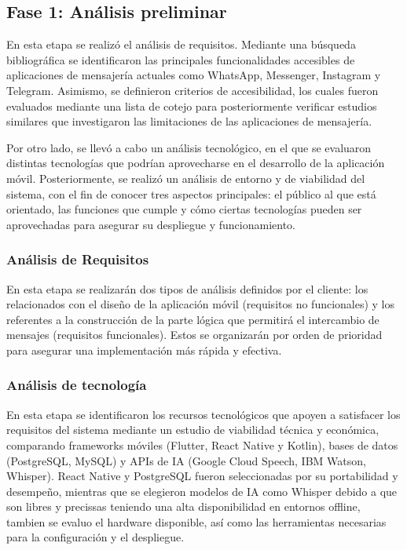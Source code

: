 \documentclass[lettersize,journal]{IEEEtran}
\begin{document}
        
        \subsection{Fase 1: Análisis preliminar}
        	
        En esta etapa se realizó el análisis de requisitos. Mediante una búsqueda bibliográfica se identificaron las principales funcionalidades accesibles de aplicaciones de mensajería actuales como WhatsApp, Messenger, Instagram y Telegram. Asimismo, se definieron criterios de accesibilidad, los cuales fueron evaluados mediante una lista de cotejo para 
        posteriormente verificar estudios similares que investigaron las limitaciones de las aplicaciones de mensajería.	    	
       
        Por otro lado, se llevó a cabo un análisis tecnológico, en el que se evaluaron distintas tecnologías que podrían aprovecharse en el desarrollo de la aplicación móvil. Posteriormente, se realizó un análisis de entorno y de viabilidad del sistema, con el fin de conocer tres aspectos principales: el público al que está orientado, las funciones que cumple y cómo ciertas tecnologías pueden ser aprovechadas para asegurar su despliegue y funcionamiento.  
        
       \subsubsection{Análisis de Requisitos}
        
        En esta etapa se realizarán dos tipos de análisis definidos por el cliente: los relacionados con el diseño de la aplicación móvil (requisitos no funcionales) y los referentes a la construcción de la parte lógica que permitirá el intercambio de mensajes (requisitos funcionales). Estos se organizarán por orden de prioridad para asegurar una implementación más rápida y efectiva.
        
        \subsubsection{Análisis de tecnología}
        
        En esta etapa se identificaron los recursos tecnológicos que apoyen a satisfacer los requisitos del sistema mediante un estudio de viabilidad técnica y económica, comparando frameworks móviles (Flutter, React Native y Kotlin), bases de datos (PostgreSQL, MySQL) y APIs de IA (Google Cloud Speech, IBM Watson, Whisper). React Native y PostgreSQL fueron seleccionadas por su portabilidad y desempeño, mientras que se elegieron modelos de IA como Whisper debido a que son libres y precissas teniendo una alta disponibilidad en entornos offline, tambien se evaluo el hardware disponible, así como las herramientas necesarias para la configuración y el despliegue.
        
\end{document}
